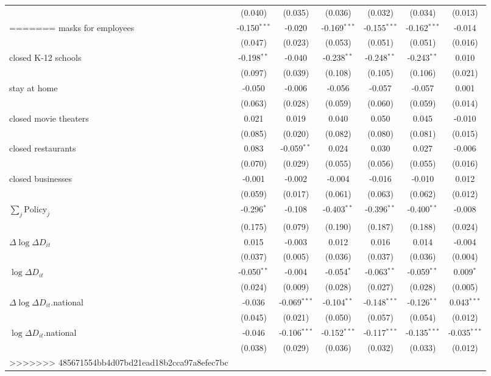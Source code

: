 \begin{tabular}{lccccc|>{}c}
 & (0.040) & (0.035) & (0.036) & (0.032) & (0.034) & (0.013)\\
=======
masks for employees & -0.150$^{***}$ & -0.020 & -0.169$^{***}$ & -0.155$^{***}$ & -0.162$^{***}$ & -0.014\\
 & (0.047) & (0.023) & (0.053) & (0.051) & (0.051) & (0.016)\\
closed K-12 schools & -0.198$^{**}$ & -0.040 & -0.238$^{**}$ & -0.248$^{**}$ & -0.243$^{**}$ & 0.010\\
 & (0.097) & (0.039) & (0.108) & (0.105) & (0.106) & (0.021)\\
stay at home & -0.050 & -0.006 & -0.056 & -0.057 & -0.057 & 0.001\\
 & (0.063) & (0.028) & (0.059) & (0.060) & (0.059) & (0.014)\\
closed movie theaters & 0.021 & 0.019 & 0.040 & 0.050 & 0.045 & -0.010\\
 & (0.085) & (0.020) & (0.082) & (0.080) & (0.081) & (0.015)\\
closed restaurants & 0.083 & -0.059$^{**}$ & 0.024 & 0.030 & 0.027 & -0.006\\
 & (0.070) & (0.029) & (0.055) & (0.056) & (0.055) & (0.016)\\
closed businesses & -0.001 & -0.002 & -0.004 & -0.016 & -0.010 & 0.012\\
 & (0.059) & (0.017) & (0.061) & (0.063) & (0.062) & (0.012)\\
$\sum_j \mathrm{Policy}_j$ & -0.296$^{*}$ & -0.108 & -0.403$^{**}$ & -0.396$^{**}$ & -0.400$^{**}$ & -0.008\\
 & (0.175) & (0.079) & (0.190) & (0.187) & (0.188) & (0.024)\\
$\Delta \log \Delta D_{it}$ & 0.015 & -0.003 & 0.012 & 0.016 & 0.014 & -0.004\\
 & (0.037) & (0.005) & (0.036) & (0.037) & (0.036) & (0.004)\\
$\log \Delta D_{it}$ & -0.050$^{**}$ & -0.004 & -0.054$^{*}$ & -0.063$^{**}$ & -0.059$^{**}$ & 0.009$^{*}$\\
 & (0.024) & (0.009) & (0.028) & (0.027) & (0.028) & (0.005)\\
$\Delta \log \Delta D_{it}$.national & -0.036 & -0.069$^{***}$ & -0.104$^{**}$ & -0.148$^{***}$ & -0.126$^{**}$ & 0.043$^{***}$\\
 & (0.045) & (0.021) & (0.050) & (0.057) & (0.054) & (0.012)\\
$\log \Delta D_{it}$.national & -0.046 & -0.106$^{***}$ & -0.152$^{***}$ & -0.117$^{***}$ & -0.135$^{***}$ & -0.035$^{***}$\\
 & (0.038) & (0.029) & (0.036) & (0.032) & (0.033) & (0.012)\\
>>>>>>> 485671554bb4d07bd21ead18b2cca97a8efec7bc
\bottomrule
\end{tabular}